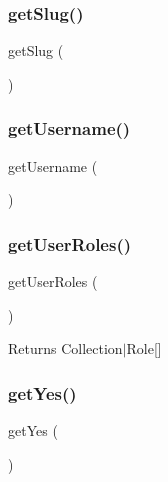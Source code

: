 \mbox{\label{class_app_1_1_entity_1_1_user_aba91cb698fc762d9fc0975c9f73ae9c4}} 
\subsubsection{\texorpdfstring{getSlug()}{getSlug()}}
{\footnotesize\ttfamily get\+Slug (\begin{DoxyParamCaption}{ }\end{DoxyParamCaption})}

\mbox{\label{class_app_1_1_entity_1_1_user_a81b37a3c9d639574e394f80c1138c75e}} 
\subsubsection{\texorpdfstring{getUsername()}{getUsername()}}
{\footnotesize\ttfamily get\+Username (\begin{DoxyParamCaption}{ }\end{DoxyParamCaption})}

\mbox{\label{class_app_1_1_entity_1_1_user_a8f1f7dad2f488ae5d74dc31bf26368e9}} 
\subsubsection{\texorpdfstring{getUserRoles()}{getUserRoles()}}
{\footnotesize\ttfamily get\+User\+Roles (\begin{DoxyParamCaption}{ }\end{DoxyParamCaption})}

\begin{DoxyReturn}{Returns}
Collection$\vert$\+Role\mbox{[}\mbox{]} 
\end{DoxyReturn}
\mbox{\label{class_app_1_1_entity_1_1_user_a08f19a82bff9dffe7599c79d64ca38b3}} 
\subsubsection{\texorpdfstring{getYes()}{getYes()}}
{\footnotesize\ttfamily get\+Yes (\begin{DoxyParamCaption}{ }\end{DoxyParamCaption})}

